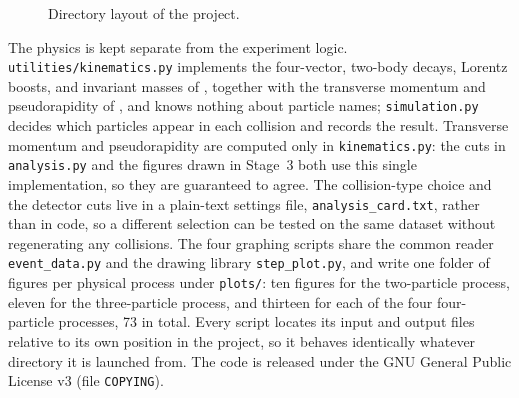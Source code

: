 \documentclass{article}
\begin{document}
\begin{figure}[H]
\centering
\begin{minipage}{0.95\textwidth}
\footnotesize
{}
\end{minipage}
\caption{Directory layout of the project.}
\label{fig:dirtree}
\end{figure}

The physics is kept separate from the experiment logic. \texttt{utilities/\allowbreak kinematics.py} implements the four-vector, two-body decays, Lorentz boosts, and invariant masses of , together with the transverse momentum and pseudorapidity of , and knows nothing about particle names; \texttt{simulation.py} decides which particles appear in each collision and records the result. Transverse momentum and pseudorapidity are computed only in \texttt{kinematics.py}: the cuts in \texttt{analysis.py} and the figures drawn in Stage~3 both use this single implementation, so they are guaranteed to agree. The collision-type choice and the detector cuts live in a plain-text settings file, \texttt{analysis\_card.txt}, rather than in code, so a different selection can be tested on the same dataset without regenerating any collisions. The four graphing scripts share the common reader \texttt{event\_data.py} and the drawing library \texttt{step\_plot.py}, and write one folder of figures per physical process under \texttt{plots/}: ten figures for the two-particle process, eleven for the three-particle process, and thirteen for each of the four four-particle processes, 73 in total. Every script locates its input and output files relative to its own position in the project, so it behaves identically whatever directory it is launched from. The code is released under the GNU General Public License v3 (file \texttt{COPYING}).
\end{document}
